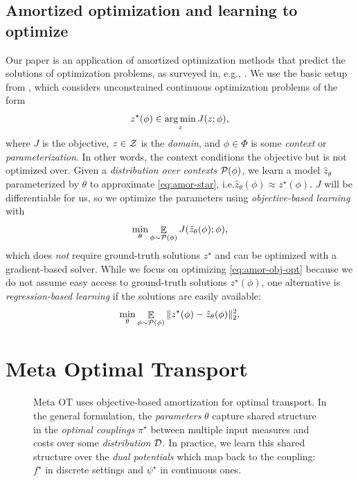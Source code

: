 \documentclass{article}
\newcommand{\eg}{e.g.\xspace}
\newcommand{\ie}{i.e.\xspace}
\begin{document}
\subsection{Amortized optimization and learning to optimize}
\label{sec:prelim:amor}
Our paper is an application of amortized optimization methods
that predict the solutions of optimization problems,
as surveyed in, \eg, \citet{chen2021learning,amos2022tutorial}.
We use the basic setup from \citet{amos2022tutorial},
which considers unconstrained continuous optimization problems of the form
\begin{equation}
  z^\star(\phi) \in \operatorname*{arg\,min}_z J(z; \phi),
  \label{eq:amor-star}
\end{equation}
where $J$ is the objective, $z\in{\mathcal{Z}}$ is the \emph{domain}, and
$\phi\in\Phi$ is some \emph{context} or \emph{parameterization}.
In other words, the context conditions the objective but
is not optimized over.
Given a \emph{distribution over contexts} ${\mathcal{P}}(\phi)$,
we learn a model $\hat z_\theta$ parameterized by $\theta$
to approximate \cref{eq:amor-star}, \ie $\hat z_\theta(\phi)\approx z^\star(\phi)$.
$J$ will be differentiable for us, so we optimize
the parameters using \emph{objective-based learning} with
\begin{equation}
  \min_\theta \mathop{\mathbb{E}}_{\phi\sim {\mathcal{P}}(\phi)} J(\hat z_\theta(\phi); \phi),
  \label{eq:amor-obj-opt}
\end{equation}
which does \emph{not} require ground-truth solutions $z^\star$
and can be optimized with a gradient-based solver.
While we focus on optimizing \cref{eq:amor-obj-opt} because we do not
assume easy access to ground-truth solutions $z^\star(\phi)$,
one alternative is \emph{regression-based learning} if the solutions are easily available:
\begin{equation}
  \min_\theta \mathop{\mathbb{E}}_{\phi\sim {\mathcal{P}}(\phi)} \|z^\star(\phi)-\hat z_\theta(\phi)\|_2^2.
  \label{eq:amor-obj-reg}
\end{equation}

\section{Meta Optimal Transport}
\label{sec:meta}
\begin{figure}[t]
  \centering
  
  \caption{
    Meta OT uses objective-based amortization for optimal transport.
    In the general formulation, the \emph{parameters} $\theta$ capture
    shared structure in the \emph{optimal couplings} $\pi^\star$ between
    multiple input measures and costs over some \emph{distribution} ${\mathcal{D}}$.
    In practice, we learn this shared structure over the
    \emph{dual potentials} which map back to the coupling:
    $f^\star$ in discrete settings and $\psi^\star$ in continuous ones.
  }
  \label{fig:meta-OT}
\end{figure}
\end{document}
